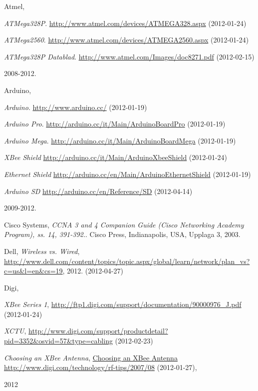 \documentclass[a4paper,11pt]{article}
\newcounter{qcounter}
\begin{document}
\clearpage
{}
{}

\begin{thebibliography}{9}

\label{atmel}
   Atmel, \\
   \begin{list}{[]}{}
   \item \emph{ATMega328P}.
   \url{http://www.atmel.com/devices/ATMEGA328.aspx} (2012-01-24)
   \item \emph{ATMega2560}.
   \url{http://www.atmel.com/devices/ATMEGA2560.aspx} (2012-01-24)
   \item \emph{ATMega328P Datablad}.
   \url{http://www.atmel.com/Images/doc8271.pdf} (2012-02-15)
   \end{list}
   2008-2012.

\label{arduino}
   Arduino,\\
   \begin{list}{[]}{}
   \item{\emph{Arduino}. \url{http://www.arduino.cc/} (2012-01-19)}
   \item{\emph{Arduino Pro}. \url{http://arduino.cc/it/Main/ArduinoBoardPro} (2012-01-19)}
   \item{\emph{Arduino Mega}. \url{http://arduino.cc/it/Main/ArduinoBoardMega} (2012-01-19)}
   \item{\emph{XBee Shield} \url{http://arduino.cc/it/Main/ArduinoXbeeShield} (2012-01-24)}
   \item{\emph{Ethernet Shield} \url{http://arduino.cc/en/Main/ArduinoEthernetShield} (2012-01-19)}
   \item{\emph{Arduino SD} \url{http://arduino.cc/en/Reference/SD} (2012-04-14)}
   \end{list}
   2009-2012.

\label{cisco}
    Cisco Systems,
    \emph{CCNA 3 and 4 Companion Guide (Cisco Networking Academy Program), ss. 14, 391-392.}.
    Cisco Press, Indianapolis, USA,
    Upplaga 3,
    2003.

\label{dell}
    Dell,
    \emph{Wireless vs. Wired},
    \url{http://www.dell.com/content/topics/topic.aspx/global/learn/network/plan_vs?c=us&l=en&cs=19},
    2012. (2012-04-27)

\label{digi}
    Digi,\\
    \begin{list}{[]}{}
    \item\emph{XBee Series 1},
    \url{http://ftp1.digi.com/support/documentation/90000976_J.pdf} (2012-01-24)
    \item \emph{XCTU},
    \url{http://www.digi.com/support/productdetail?pid=3352&osvid=57&type=cabling} (2012-02-23)
    \item \emph{Choosing an XBee Antenna},
    \url{Choosing an XBee Antenna http://www.digi.com/technology/rf-tips/2007/08} (2012-01-27),
    \end{list}
    2012


\end{thebibliography}
\end{document}
